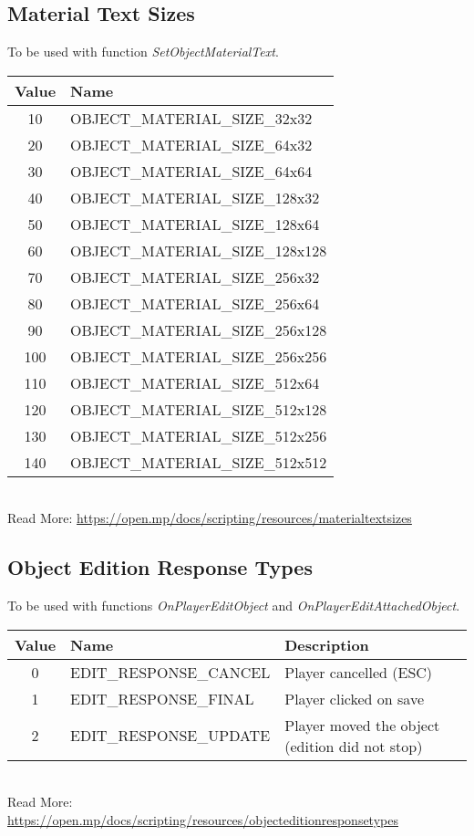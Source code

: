 \documentclass{article}
\begin{document}
\subsection{Material Text Sizes}
To be used with function \textit{SetObjectMaterialText}.
\bigskip
\\\begin{tabular}{ |c|l| }
\hline
Value & Name \\
\hline
10 & OBJECT\_MATERIAL\_SIZE\_32x32 \\
20 & OBJECT\_MATERIAL\_SIZE\_64x32 \\
30 & OBJECT\_MATERIAL\_SIZE\_64x64 \\
40 & OBJECT\_MATERIAL\_SIZE\_128x32 \\
50 & OBJECT\_MATERIAL\_SIZE\_128x64 \\
60 & OBJECT\_MATERIAL\_SIZE\_128x128 \\
70 & OBJECT\_MATERIAL\_SIZE\_256x32 \\
80 & OBJECT\_MATERIAL\_SIZE\_256x64 \\
90 & OBJECT\_MATERIAL\_SIZE\_256x128 \\
100 & OBJECT\_MATERIAL\_SIZE\_256x256 \\
110 & OBJECT\_MATERIAL\_SIZE\_512x64 \\
120 & OBJECT\_MATERIAL\_SIZE\_512x128 \\
130 & OBJECT\_MATERIAL\_SIZE\_512x256 \\
140 & OBJECT\_MATERIAL\_SIZE\_512x512 \\
\hline
\end{tabular}
\bigskip
\\Read More: \url{https://open.mp/docs/scripting/resources/materialtextsizes}


\subsection{Object Edition Response Types}
To be used with functions \textit{OnPlayerEditObject} and \textit{OnPlayerEditAttachedObject}.
\bigskip
\\\begin{tabular}{ |c|l|l| }
\hline
Value & Name & Description \\
\hline
0 & EDIT\_RESPONSE\_CANCEL & Player cancelled (ESC) \\
1 & EDIT\_RESPONSE\_FINAL & Player clicked on save \\
2 & EDIT\_RESPONSE\_UPDATE & Player moved the object (edition did not stop) \\
\hline
\end{tabular}
\bigskip
\\Read More: \url{https://open.mp/docs/scripting/resources/objecteditionresponsetypes}
\end{document}

